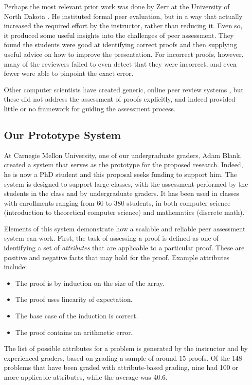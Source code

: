 \documentclass[12pt]{article}
\begin{document}
Perhaps the most relevant prior work was done by Zerr at the
University of North Dakota \cite{zerr-primus11}.
He instituted formal peer evaluation, but
in a way that actually increased the required effort by the
instructor, rather than reducing it.  Even so, it produced some
useful insights into the challenges of peer assessment.  They found
the students were good at identifying correct proofs and then
supplying useful advice on how to improve the presentation.  For
incorrect proofs, however, many of the reviewers failed to even detect
that they were incorrect, and even fewer were able to pinpoint the exact error.

Other computer scientists have created generic, online peer review systems
\cite{gehringer-sigcse05, wolfe-ite04}, but these did not address the
assessment of proofs explicitly, and indeed provided little or no
framework for guiding the assessment process.

\subsection{Our Prototype System}

At Carnegie Mellon University, one of our undergraduate graders, Adam
Blank, created a system that serves as the prototype for the proposed
research.  Indeed, he is now a PhD student and this proposal seeks
funding to support him.  The system is designed to support large classes,
with the assessment performed by the students in the class and by
undergraduate graders.  It has been used in classes with enrollments
ranging from 60 to 380 students, in both computer science (introduction
to theoretical computer science) and mathematics (discrete math).

Elements of this system demonstrate 
how a scalable and reliable peer assessment system can work.  First,
the task of assessing a proof is defined as one of identifying a set of
{\em attributes} that are applicable to a particular proof.  These are
positive and negative facts that may hold for the proof.  Example
attributes include:
\begin{itemize}
\item The proof is by induction on the size of the array.
\item The proof uses linearity of expectation.
\item The base case of the induction is correct.
\item The proof contains an arithmetic error.
\end{itemize}
The list of possible attributes for a problem is generated by the
instructor and by experienced graders, based on grading a sample of
around 15 proofs.  Of the 148 problems that have been graded with
attribute-based grading, nine had 100 or more applicable attributes,
while the average was 40.6.  
\end{document}
